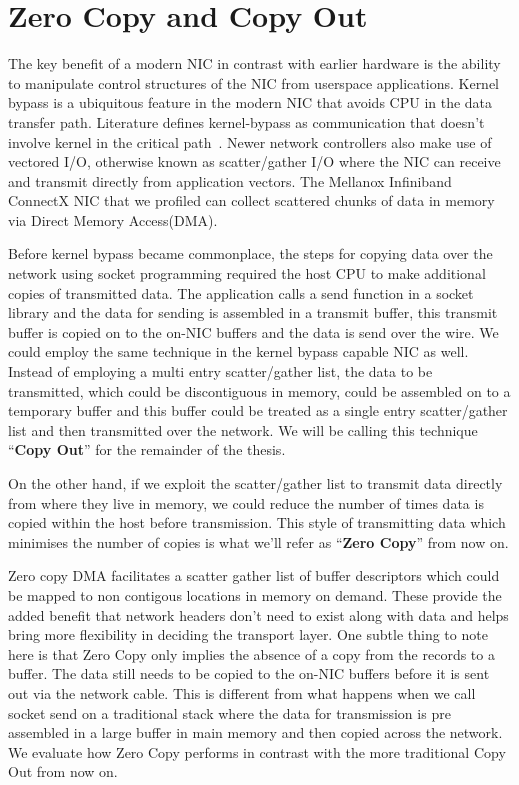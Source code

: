 \section{Zero Copy and Copy Out}
The key benefit of a modern NIC in contrast with earlier hardware is the ability to manipulate control structures of the NIC from userspace applications. 
Kernel bypass is a ubiquitous feature in the modern NIC that avoids CPU in the data transfer path. Literature defines kernel-bypass as communication that doesn't 
involve kernel in the critical path~\cite{unetkernelbypass}. Newer network controllers also make use of vectored I/O, otherwise known as scatter/gather I/O
where the NIC can receive and transmit directly from application vectors. The Mellanox Infiniband ConnectX
NIC that we profiled can collect scattered chunks of data in memory via Direct Memory Access(DMA).

Before kernel bypass became commonplace, the steps for copying data over the network using socket programming 
required the host CPU to make additional copies of transmitted data.
The application calls a send function in a socket library and the data for sending is assembled 
in a transmit buffer, this transmit buffer is copied on to the on-NIC buffers and the data is 
send over the wire. We could employ the same technique in the kernel bypass capable NIC as well.
Instead of employing a multi entry scatter/gather list, the data to be transmitted, which could be discontiguous in memory, could be assembled on 
to a temporary buffer and this buffer could be treated as a single entry scatter/gather list
and then transmitted over the network. We will be calling this technique \enquote{\textbf{Copy Out}} for the remainder of the thesis. 

On the other hand, if we exploit the scatter/gather list to 
transmit data directly from where they live in memory, we could reduce the number of times data is copied within the host before transmission. This style of transmitting data which minimises 
the number of copies is what we'll refer as \enquote{\textbf{Zero Copy}} from now on.



Zero copy DMA facilitates a scatter gather list of buffer descriptors
which could be mapped to non contigous locations in memory on demand. These provide
the added benefit that network headers don't need to exist along with data and helps bring more flexibility 
in deciding the transport layer. One subtle thing to note here is that Zero Copy only implies the absence 
of a copy from the records to a buffer. The data still needs to be copied to the on-NIC buffers before 
it is sent out via the network cable. This is different from what happens when we call socket send on 
a traditional stack where the data for transmission is pre assembled in a large buffer in main memory 
and then copied across the network. We evaluate how Zero Copy performs in contrast 
with the more traditional Copy Out from now on.

